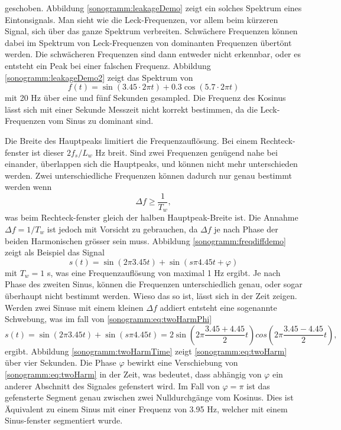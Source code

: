 geschoben.
Abbildung \ref{sonogramm:leakageDemo} zeigt ein solches Spektrum eines Eintonsignals.
Man sieht wie die Leck-Frequenzen, vor allem beim kürzeren Signal,
sich über das ganze Spektrum verbreiten.
Schwächere Frequenzen können dabei im Spektrum von Leck-Frequenzen von dominanten Frequenzen
übertönt werden.
Die schwächeren Frequenzen sind dann entweder nicht erkennbar, oder es entsteht ein Peak 
bei einer falschen Frequenz. 
Abbildung \ref{sonogramm:leakageDemo2} zeigt das Spektrum von 
\begin{equation}
    f(t) = \sin(3.45\cdot 2\pi t) + 0.3  \cos(5.7\cdot  2\pi t)
\label{sonogramm:eq:sigLeck}
\end{equation}
mit 20 Hz über eine und fünf Sekunden gesampled.
Die Frequenz des Kosinus lässt sich mit einer Sekunde Messzeit nicht korrekt bestimmen, 
da die Leck-Frequenzen vom Sinus zu dominant sind.

Die Breite des Hauptpeaks limitiert die Frequenzauflösung.
Bei einem Rechteck-fenster ist dieser $2f_s/L_w$ Hz breit.
Sind zwei Frequenzen genügend nahe bei einander, überlappen sich die Hauptpeaks, und können
nicht mehr unterschieden werden. 
Zwei unterschiedliche Frequenzen können dadurch nur genau bestimmt werden wenn
\begin{equation}
    \Delta f \geq \frac{1}{T_w},
\end{equation}
was beim Rechteck-fenster gleich der halben Hauptpeak-Breite ist.
Die Annahme $\Delta f = 1/T_w$ ist jedoch mit Vorsicht zu gebrauchen, da $\Delta f$ je nach 
Phase der beiden Harmonischen grösser sein muss.
Abbildung \ref{sonogramm:freqdiffdemo} zeigt als Beispiel das Signal
\begin{equation}
    s(t) = \sin(2\pi 3.45 t ) + \sin (s\pi 4.45 t + \varphi)
    \label{sonogramm:eq:twoHarmPhi}
\end{equation}
mit $T_w = 1$ s, was eine Frequenzauflösung von maximal 1 Hz ergibt.
Je nach Phase des zweiten Sinus, können die Frequenzen unterschiedlich genau, oder sogar überhaupt nicht
bestimmt werden.
Wieso das so ist, lässt sich in der Zeit zeigen.
Werden zwei Sinuse mit einem kleinen $\Delta f$ addiert entsteht eine sogenannte Schwebung,
was im fall von \eqref{sonogramm:eq:twoHarmPhi}
\begin{equation}
    s(t) = \sin(2\pi 3.45 t ) + \sin (s\pi 4.45 t) = 2 \sin(2 \pi \frac{3.45 + 4.45}{2}t)
    cos(2 \pi  \frac{3.45 - 4.45}{2} t),
\label{sonogramm:eq:twoHarm}
\end{equation}
ergibt.
Abbildung \ref{sonogramm:twoHarmTime} zeigt \eqref{sonogramm:eq:twoHarm} über vier Sekunden.
Die Phase $\varphi$ bewirkt eine Verschiebung von \eqref{sonogramm:eq:twoHarm} in der Zeit, 
was bedeutet, dass abhängig von $\varphi$ ein anderer Abschnitt des Signales gefenstert wird.
Im Fall von $\varphi = \pi$ ist das gefensterte Segment genau zwischen zwei Nulldurchgänge
vom Kosinus.
Dies ist Äquivalent zu einem Sinus mit einer Frequenz von 3.95 Hz, welcher mit einem 
Sinus-fenster segmentiert wurde. 


